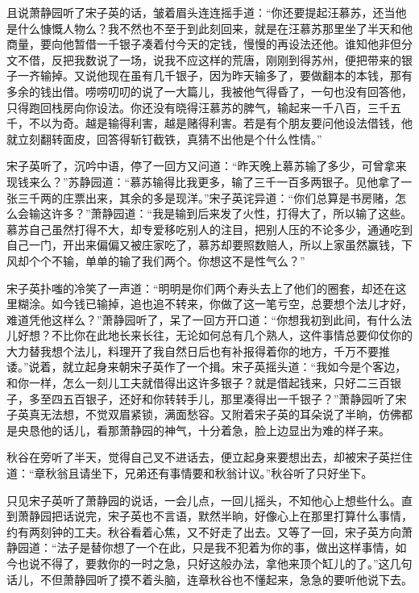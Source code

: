 \documentclass[12pt,UTF8]{ctexbook}
\begin{document}
{{{且说萧静园听了宋子英的话，皱着眉头连连摇手道：“你还要提起汪慕苏，还当他是什么慷慨人物么？我不然也不至于到此刻回来，就是在汪慕苏那里坐了半天和他商量，要向他暂借一千银子凑着付今天的定钱，慢慢的再设法还他。谁知他非但分文不借，反把我数说了一场，说我不应这样的荒唐，刚刚到得苏州，便把带来的银子一齐输掉。又说他现在虽有几千银子，因为昨天输多了，要做翻本的本钱，那有多余的钱出借。唠唠叨叨的说了一大篇儿，我被他气得昏了，一句也没有回答他，只得跑回栈房向你设法。你还没有晓得汪慕苏的脾气，输起来一千八百，三千五千，不以为奇。越是输得利害，越是赌得利害。若是有个朋友要问他设法借钱，他就立刻翻转面皮，回答得斩钉截铁，真猜不出他是个什么性情。”

宋子英听了，沉吟中语，停了一回方又问道：“昨天晚上慕苏输了多少，可曾拿来现钱来么？”苏静园道：“慕苏输得比我更多，输了三千一百多两银子。见他拿了一张三千两的庄票出来，其余的多是现洋。”宋子英诧异道：“你们总算是书房赌，怎么会输这许多？”萧静园道：“我是输到后来发了火性，打得大了，所以输了这些。慕苏自己虽然打得不大，却专爱移吃别人的注目，把别人压的不论多少，通通吃到自己一门，开出来偏偏又被庄家吃了，慕苏却要照数赔人，所以上家虽然赢钱，下风却个个不输，单单的输了我们两个。你想这不是性气么？”

宋子英扑嗤的冷笑了一声道：“明明是你们两个寿头去上了他们的圈套，却还在这里糊涂。如今钱已输掉，追也追不转来，你做了这一笔亏空，总要想个法儿才好，难道凭他这样么？”萧静园听了，呆了一回方开口道：“你想我初到此间，有什么法儿好想？不比你在此地长来长往，无论如何总有几个熟人，这件事情总要仰仗你的大力替我想个法儿，料理开了我自然日后也有补报得着你的地方，千万不要推诿。”说着，就立起身来朝宋子英作了一个揖。宋子英摇头道：“我如今是个客边，和你一样，怎么一刻儿工夫就借得出这许多银子？就是借起钱来，只好二三百银子，多至四五百银子，还好和你转转手儿，那里凑得出一千银子？”萧静园听了宋子英真无法想，不觉双眉紧锁，满面愁容。又附着宋子英的耳朵说了半晌，仿佛都是央恳他的话儿，看那萧静园的神气，十分着急，脸上边显出为难的样子来。

秋谷在旁听了半天，觉得自己叉不进话去，便立起身来要想出去，却被宋子英拦住道：“章秋翁且请坐下，兄弟还有事情要和秋翁计议。”秋谷听了只好坐下。

只见宋子英听了萧静园的说话，一会儿点，一回儿摇头，不知他心上想些什么。直到萧静园把话说完，宋子英也不言语，默然半晌，好像心上在那里打算什么事情，约有两刻钟的工夫。秋谷看着心焦，又不好走了出去。又等了一回，宋子英方向萧静园道：“法子是替你想了一个在此，只是我不犯着为你的事，做出这样事情，如今也说不得了，要救你的一时之急，只好这般办法，拿他来顶个缸儿的了。”这几句话儿，不但萧静园听了摸不着头脑，连章秋谷也不懂起来，急急的要听他说下去。

}}}
\end{document}
